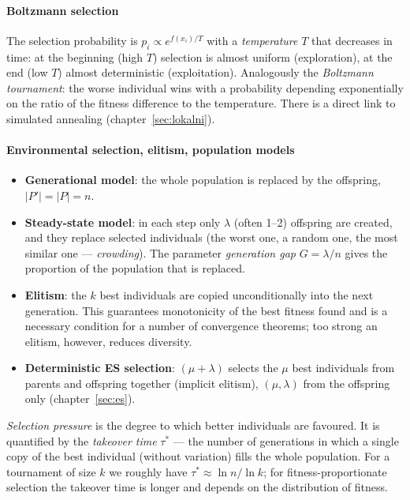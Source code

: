 \documentclass[11pt,a4paper]{article}
\theoremstyle{definition}
\begin{document}
\paragraph{Boltzmann selection}

The selection probability is $p_i \propto e^{f(x_i)/T}$ with a
\emph{temperature} $T$ that decreases in time: at the beginning (high $T$)
selection is almost uniform (exploration), at the end (low $T$) almost
deterministic (exploitation). Analogously the \emph{Boltzmann tournament}: the
worse individual wins with a probability depending exponentially on the ratio of
the fitness difference to the temperature. There is a direct link to simulated
annealing (chapter~\ref{sec:lokalni}).

\paragraph{Environmental selection, elitism, population models}

\begin{itemize}
\item \textbf{Generational model}: the whole population is replaced by the
  offspring, $|P'| = |P| = n$.
\item \textbf{Steady-state model}: in each step only $\lambda$ (often 1--2)
  offspring are created, and they replace selected individuals (the worst one, a
  random one, the most similar one --- \emph{crowding}). The parameter
  \emph{generation gap} $G = \lambda/n$ gives the proportion of the population
  that is replaced.
\item \textbf{Elitism}: the $k$ best individuals are copied unconditionally into
  the next generation. This guarantees monotonicity of the best fitness found
  and is a necessary condition for a number of convergence theorems; too strong
  an elitism, however, reduces diversity.
\item \textbf{Deterministic ES selection}: $(\mu+\lambda)$ selects the $\mu$ best
  individuals from parents and offspring together (implicit elitism),
  $(\mu,\lambda)$ from the offspring only (chapter~\ref{sec:es}).
\end{itemize}

\begin{defbox}
\emph{Selection pressure} is the degree to which better individuals are
favoured. It is quantified by the \emph{takeover time} $\tau^*$ --- the number of
generations in which a single copy of the best individual (without variation)
fills the whole population. For a tournament of size $k$ we roughly have
$\tau^* \approx \ln n/\ln k$; for fitness-proportionate selection the takeover
time is longer and depends on the distribution of fitness.
\end{defbox}
\end{document}
